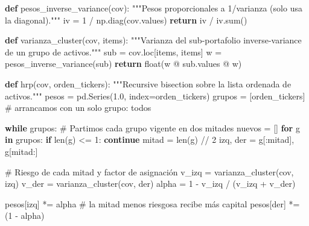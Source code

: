 \documentclass[
  spanish,
  letterpaper,
  DIV=11,
  numbers=noendperiod]{scrreprt}
\newenvironment{Shaded}{\begin{snugshade}}{\end{snugshade}}
\newcommand{\BuiltInTok}[1]{\textcolor[rgb]{0.00,0.23,0.31}{#1}}
\newcommand{\CommentTok}[1]{\textcolor[rgb]{0.37,0.37,0.37}{#1}}
\newcommand{\ControlFlowTok}[1]{\textcolor[rgb]{0.00,0.23,0.31}{\textbf{#1}}}
\newcommand{\DecValTok}[1]{\textcolor[rgb]{0.68,0.00,0.00}{#1}}
\newcommand{\FloatTok}[1]{\textcolor[rgb]{0.68,0.00,0.00}{#1}}
\newcommand{\KeywordTok}[1]{\textcolor[rgb]{0.00,0.23,0.31}{\textbf{#1}}}
\newcommand{\NormalTok}[1]{\textcolor[rgb]{0.00,0.23,0.31}{#1}}
\newcommand{\OperatorTok}[1]{\textcolor[rgb]{0.37,0.37,0.37}{#1}}
\begin{document}
\label{hrp-implementacion}
\begin{Shaded}
\begin{Highlighting}[]
\KeywordTok{def}\NormalTok{ pesos\_inverse\_variance(cov):}
    \CommentTok{"""Pesos proporcionales a 1/varianza (solo usa la diagonal)."""}
\NormalTok{    iv }\OperatorTok{=} \DecValTok{1} \OperatorTok{/}\NormalTok{ np.diag(cov.values)}
    \ControlFlowTok{return}\NormalTok{ iv }\OperatorTok{/}\NormalTok{ iv.}\BuiltInTok{sum}\NormalTok{()}

\KeywordTok{def}\NormalTok{ varianza\_cluster(cov, items):}
    \CommentTok{"""Varianza del sub{-}portafolio inverse{-}variance de un grupo de activos."""}
\NormalTok{    sub }\OperatorTok{=}\NormalTok{ cov.loc[items, items]}
\NormalTok{    w }\OperatorTok{=}\NormalTok{ pesos\_inverse\_variance(sub)}
    \ControlFlowTok{return} \BuiltInTok{float}\NormalTok{(w }\OperatorTok{@}\NormalTok{ sub.values }\OperatorTok{@}\NormalTok{ w)}

\KeywordTok{def}\NormalTok{ hrp(cov, orden\_tickers):}
    \CommentTok{"""Recursive bisection sobre la lista ordenada de activos."""}
\NormalTok{    pesos }\OperatorTok{=}\NormalTok{ pd.Series(}\FloatTok{1.0}\NormalTok{, index}\OperatorTok{=}\NormalTok{orden\_tickers)}
\NormalTok{    grupos }\OperatorTok{=}\NormalTok{ [orden\_tickers]                      }\CommentTok{\# arrancamos con un solo grupo: todos}

    \ControlFlowTok{while}\NormalTok{ grupos:}
        \CommentTok{\# Partimos cada grupo vigente en dos mitades}
\NormalTok{        nuevos }\OperatorTok{=}\NormalTok{ []}
        \ControlFlowTok{for}\NormalTok{ g }\KeywordTok{in}\NormalTok{ grupos:}
            \ControlFlowTok{if} \BuiltInTok{len}\NormalTok{(g) }\OperatorTok{\textless{}=} \DecValTok{1}\NormalTok{:}
                \ControlFlowTok{continue}
\NormalTok{            mitad }\OperatorTok{=} \BuiltInTok{len}\NormalTok{(g) }\OperatorTok{//} \DecValTok{2}
\NormalTok{            izq, der }\OperatorTok{=}\NormalTok{ g[:mitad], g[mitad:]}

            \CommentTok{\# Riesgo de cada mitad y factor de asignación}
\NormalTok{            v\_izq }\OperatorTok{=}\NormalTok{ varianza\_cluster(cov, izq)}
\NormalTok{            v\_der }\OperatorTok{=}\NormalTok{ varianza\_cluster(cov, der)}
\NormalTok{            alpha }\OperatorTok{=} \DecValTok{1} \OperatorTok{{-}}\NormalTok{ v\_izq }\OperatorTok{/}\NormalTok{ (v\_izq }\OperatorTok{+}\NormalTok{ v\_der)}

\NormalTok{            pesos[izq] }\OperatorTok{*=}\NormalTok{ alpha        }\CommentTok{\# la mitad menos riesgosa recibe más capital}
\NormalTok{            pesos[der] }\OperatorTok{*=}\NormalTok{ (}\DecValTok{1} \OperatorTok{{-}}\NormalTok{ alpha)}


\end{Highlighting}
\end{Shaded}
\end{document}

